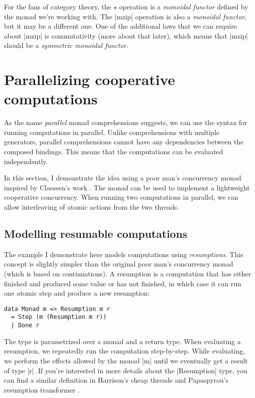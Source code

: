 \documentclass{tmr}
\begin{document}
For the fans of category theory, the $\star$ operation is a \textit{monoidal functor} defined by
the monad we're working with. The |mzip| operation is also a \textit{monoidal functor}, but it may 
be a different one. One of the additional laws that we can require about |mzip| is commutativity 
(more about that later), which means that |mzip| should be a \textit{symmetric monoidal functor}.


\section{Parallelizing cooperative computations}

As the name \textit{parallel} monad comprehensions suggests, we can use the syntax for 
running computations in parallel. Unlike comprehensions with multiple generators, parallel
comprehensions cannot have any dependencies between the composed bindings. This means that the 
computations can be evaluated independently. 

In this section, I demonstrate the idea using a poor man's concurrency monad inspired by Claessen's
work \cite{poorman}. The monad can be used to implement a lightweight cooperative concurrency. When 
running two computations in parallel, we can allow interleaving of atomic actions from the two 
threads.


\subsection{Modelling resumable computations}

The example I demonstrate here models computations using \textit{resumptions}. This concept is 
slightly simpler than the original poor man's concurrency monad (which is based on continuations). 
A resumption is a computation that has either finished and produced some value or has not
finished, in which case it can run one atomic step and produce a new resumption:

\begin{verbatim}
data Monad m => Resumption m r 
  = Step (m (Resumption m r))
  | Done r
\end{verbatim}
The type is parametrized over a monad and a return type. When evaluating a resumption, we 
repeatedly run the computation step-by-step. While evaluating, we perform the effects allowed by
the monad |m| until we eventually get a result of type |r|. If you're interested in more details 
about the |Resumption| type, you can find a similar definition in Harrison's cheap threads 
\cite{cheapthreads} and Papaspyrou's resumption transformer \cite{resmonad}.
\end{document}
